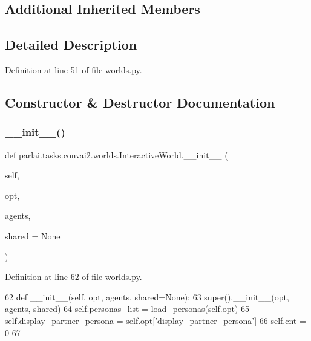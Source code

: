 \subsection*{Additional Inherited Members}


\subsection{Detailed Description}


Definition at line 51 of file worlds.\+py.



\subsection{Constructor \& Destructor Documentation}
\mbox{\label{classparlai_1_1tasks_1_1convai2_1_1worlds_1_1InteractiveWorld_a5fb521abcaeae7438ab08feff1bdfccf}} 
\subsubsection{\texorpdfstring{\+\_\+\+\_\+init\+\_\+\+\_\+()}{\_\_init\_\_()}}
{\footnotesize\ttfamily def parlai.\+tasks.\+convai2.\+worlds.\+Interactive\+World.\+\_\+\+\_\+init\+\_\+\+\_\+ (\begin{DoxyParamCaption}\item[{}]{self,  }\item[{}]{opt,  }\item[{}]{agents,  }\item[{}]{shared = {\ttfamily None} }\end{DoxyParamCaption})}



Definition at line 62 of file worlds.\+py.


\begin{DoxyCode}
62     \textcolor{keyword}{def }\_\_init\_\_(self, opt, agents, shared=None):
63         super().\_\_init\_\_(opt, agents, shared)
64         self.personas\_list = \hyperlink{namespaceparlai_1_1tasks_1_1convai2_1_1worlds_a61a758b7cb43183397d002f7f203f586}{load\_personas}(self.opt)
65         self.display\_partner\_persona = self.opt[\textcolor{stringliteral}{'display\_partner\_persona'}]
66         self.cnt = 0
67 
\end{DoxyCode}


